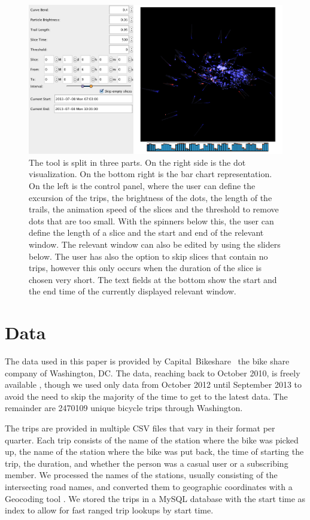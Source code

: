 \begin{figure}[ht!]
\centering
\includegraphics[width=0.9\linewidth]{images/tool.png}
\caption{The tool is split in three parts. On the right side is the
dot visualization. On the bottom right is the bar chart representation.
On the left is the control panel,
where the user can define the excursion of the trips, the brightness of
the dots, the length of the trails, the animation speed of the slices
and the threshold to remove dots that are too small.
With the spinners below this, the user can define the length of a slice and
the start and end of the relevant window.
The relevant window can also be edited by using the sliders below.
The user has also the option to skip slices that contain no trips, however
this only occurs when the duration of the slice is chosen very short.
The text fields at the bottom show the start and the end time of the
currently displayed relevant window.
}
\label{fig:tool}
\end{figure}

\section{Data}
\label{sec:data}
The data used in this paper is provided by Capital~Bikeshare~\cite{wash}
the bike share company of Washington, DC. The data, reaching back
to October 2010, is freely available \cite{data}, though we used
only data from October 2012 until September 2013 to avoid the need
to skip the majority of the time to get to the latest data.
The remainder are 2470109 unique bicycle trips through Washington.

The trips are provided in multiple CSV files that vary in their format
per quarter.
Each trip consists of the name of the station where the bike was
picked up, the name of the station where the bike was put back, the time of
starting the trip, the duration, and whether the person was a
casual user or a subscribing member.
We processed the names of the stations,
usually consisting of the intersecting road names,
and converted them to geographic coordinates with a Geocoding
tool \cite{convert}.
We stored the trips in a MySQL database with the start time
as index to allow for fast ranged trip lookups by start time.
